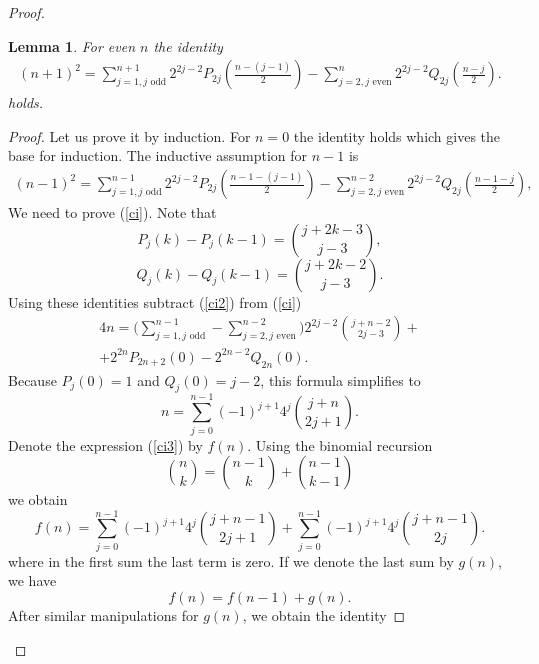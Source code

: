 \documentclass[11pt]{amsart}
\newtheorem{lemma}[theorem]{Lemma}
\begin{document}
\begin{proof}
	\begin{lemma}
		For even $n$ the identity
		\begin{eqnarray}\label{ci}
		(n+1)^2=\sum_{j=1,\text{$j$ odd}}^{n+1}2^{2j-2}P_{2j}(\frac{n-(j-1)}{2})-\sum_{j=2,\text{$j$ even}}^{n}2^{2j-2}Q_{2j}(\frac{n-j}{2}).
		\end{eqnarray}
		holds.
	\end{lemma}
	\begin{proof}
		Let us prove it by induction. For $n=0$ the identity holds which gives the base for induction.
		The inductive assumption for $n-1$ is
		\begin{eqnarray}\label{ci2}
		(n-1)^2=\sum_{j=1,\text{$j$ odd}}^{n-1}2^{2j-2}P_{2j}(\frac{n-1-(j-1)}{2})-\sum_{j=2,\text{$j$ even}}^{n-2}2^{2j-2}Q_{2j}(\frac{n-1-j}{2}),
		\end{eqnarray}
		We need to prove (\ref{ci}). Note that 
		\begin{equation*}
		P_{j}(k)-P_{j}(k-1)=\binom{j+2k-3}{j-3},
		\end{equation*}
		\begin{equation*}
		Q_{j}(k)-Q_{j}(k-1)=\binom{j+2k-2}{j-3}.
		\end{equation*}
		Using these identities subtract  (\ref{ci2}) from (\ref{ci})
		\begin{eqnarray*}
		4n=\Big(\sum_{j=1,\text{$j$ odd}}^{n-1}-\sum_{j=2,\text{$j$ even}}^{n-2}\Big)2^{2j-2}\binom{j+n-2}{2j-3}+\\ \nonumber
		+2^{2n}P_{2n+2}(0)-2^{2n-2}Q_{2n}(0).
		\end{eqnarray*}
		Because $P_j(0)=1$ and $Q_j(0)=j-2$, this formula simplifies to	
		\begin{equation}\label{ci3}
		n=\sum_{j=0}^{n-1}(-1)^{j+1}4^j\binom{j+n}{2j+1}.
		\end{equation}
		Denote the expression (\ref{ci3}) by $f(n)$. Using the binomial recursion
		\begin{equation*}
		\binom{n}{k}=\binom{n-1}{k}+\binom{n-1}{k-1}
		\end{equation*}
		we obtain
		\begin{equation*}
		f(n)=\sum_{j=0}^{n-1}(-1)^{j+1}4^j\binom{j+n-1}{2j+1}+\sum_{j=0}^{n-1}(-1)^{j+1}4^j\binom{j+n-1}{2j}.
		\end{equation*}
		where in the first sum the last term is zero. If we denote the last sum by $g(n)$, we have 
		\begin{equation}\label{rec1}
		f(n)=f(n-1)+g(n).
		\end{equation}
		After similar manipulations for $g(n)$, we obtain the identity

\end{proof}
\end{proof}
\end{document}

